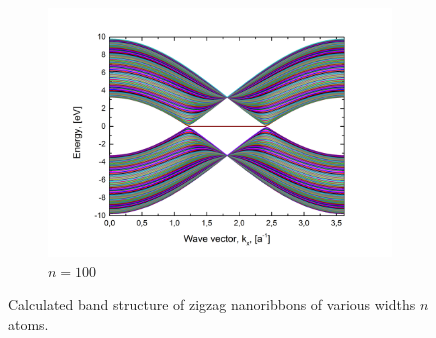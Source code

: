 \begin{figure}[hb!]
\begin{subfigure}{.5\textwidth}
  \includegraphics[width=\linewidth]{img/zz_ribbon_100}
  \caption{$n=100$}
  \label{fig:zz100}
\end{subfigure}
\caption{Calculated band structure of zigzag nanoribbons of various widths $n$ atoms.\label{fig:zz_ribbons}}
\end{figure}
